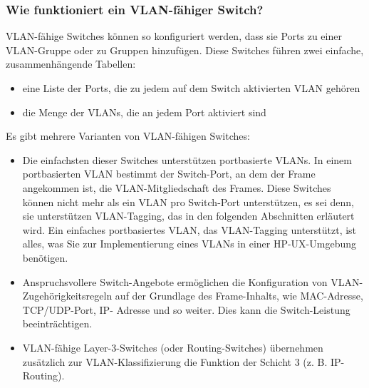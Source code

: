         \subsubsection{Wie funktioniert ein VLAN-fähiger Switch?}

       VLAN-fähige Switches können so konfiguriert werden, dass sie Ports zu einer VLAN-Gruppe oder zu Gruppen hinzufügen. Diese Switches führen zwei einfache, zusammenhängende Tabellen:

        \begin{itemize}
            \item eine Liste der Ports, die zu jedem auf dem Switch aktivierten VLAN gehören
            \item die Menge der VLANs, die an jedem Port aktiviert sind
        \end{itemize}

        Es gibt mehrere Varianten von VLAN-fähigen Switches:

        \begin{itemize}
            \item Die einfachsten dieser Switches unterstützen portbasierte VLANs. In einem portbasierten VLAN bestimmt der Switch-Port, an dem der Frame angekommen ist, die VLAN-Mitgliedschaft des Frames. Diese Switches können nicht mehr als ein VLAN pro Switch-Port unterstützen, es sei denn, sie unterstützen VLAN-Tagging, das in den folgenden Abschnitten erläutert wird. Ein einfaches portbasiertes VLAN, das VLAN-Tagging unterstützt, ist alles, was Sie zur Implementierung eines VLANs in einer HP-UX-Umgebung benötigen.
            \item Anspruchsvollere Switch-Angebote ermöglichen die Konfiguration von VLAN- Zugehörigkeitsregeln auf der Grundlage des Frame-Inhalts, wie MAC-Adresse, TCP/UDP-Port, IP- Adresse und so weiter. Dies kann die Switch-Leistung beeinträchtigen.
            \item VLAN-fähige Layer-3-Switches (oder Routing-Switches) übernehmen zusätzlich zur VLAN-Klassifizierung die Funktion der Schicht 3 (z. B. IP-Routing).
        \end{itemize}

